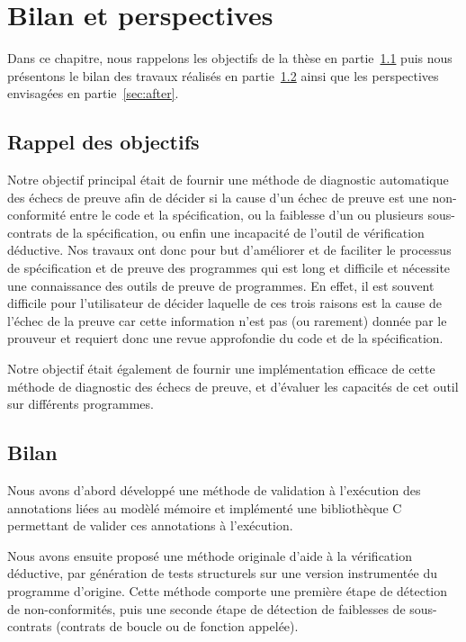 
\chapter{Bilan et perspectives}
\label{sec:end}


Dans ce chapitre, nous rappelons les objectifs de la thèse en
partie~\ref{sec:obj} puis nous présentons le bilan des travaux réalisés en
partie~\ref{sec:bilan} ainsi que les perspectives envisagées en
partie~\ref{sec:after}.


\section{Rappel des objectifs}
\label{sec:obj}


Notre objectif principal était de fournir une méthode de diagnostic automatique
des échecs de preuve afin de décider si la cause d'un échec de preuve est une
non-conformité entre le code et la spécification, ou la faiblesse d'un ou
plusieurs sous-contrats de la spécification, ou enfin une incapacité de l'outil
de vérification déductive.
Nos travaux ont donc pour but d'améliorer et de faciliter le processus de
spécification et de preuve des programmes qui est long et difficile et nécessite
une connaissance des outils de preuve de programmes.
En effet, il est souvent difficile pour l'utilisateur de décider laquelle de ces
trois raisons est la cause de l'échec de la preuve car cette information n'est
pas (ou rarement) donnée par le prouveur et requiert donc une revue approfondie
du code et de la spécification.

Notre objectif était également de fournir une implémentation efficace de cette
méthode de diagnostic des échecs de preuve, et d'évaluer les capacités de cet
outil sur différents programmes.


\section{Bilan}
\label{sec:bilan}


Nous avons d'abord développé une méthode de validation à l'exécution des
annotations \eacsl liées au modèlé mémoire et implémenté une bibliothèque C
permettant de valider ces annotations à l'exécution.

Nous avons ensuite proposé une méthode originale d'aide à la vérification
déductive, par génération de tests structurels sur une version instrumentée du
programme d'origine.
Cette méthode comporte une première étape de détection de non-conformités,
puis une seconde étape de détection de faiblesses de sous-contrats (contrats
de boucle ou de fonction appelée).

